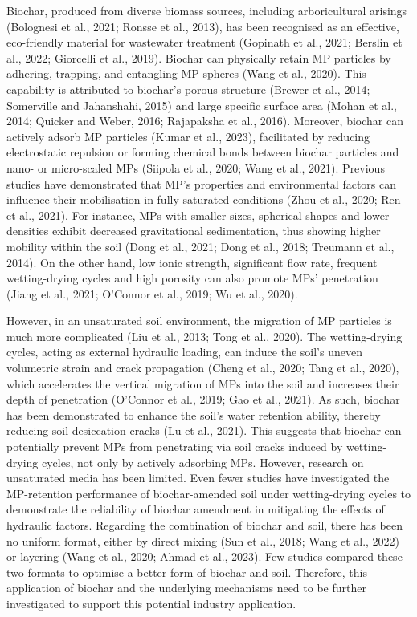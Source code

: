 Biochar, produced from diverse biomass sources, including arboricultural arisings (Bolognesi et al., 2021; Ronsse et al., 2013), has been recognised as an effective, eco-friendly material for wastewater treatment (Gopinath et al., 2021; Berslin et al., 2022; Giorcelli et al., 2019). Biochar can physically retain MP particles by adhering, trapping, and entangling MP spheres (Wang et al., 2020). This capability is attributed to biochar's porous structure (Brewer et al., 2014; Somerville and Jahanshahi, 2015) and large specific surface area (Mohan et al., 2014; Quicker and Weber, 2016; Rajapaksha et al., 2016). Moreover, biochar can actively adsorb MP particles (Kumar et al., 2023), facilitated by reducing electrostatic repulsion or forming chemical bonds between biochar particles and nano- or micro-scaled MPs (Siipola et al., 2020; Wang et al., 2021). Previous studies have demonstrated that MP’s properties and environmental factors can influence their mobilisation in fully saturated conditions (Zhou et al., 2020; Ren et al., 2021). For instance, MPs with smaller sizes, spherical shapes and lower densities exhibit decreased gravitational sedimentation, thus showing higher mobility within the soil (Dong et al., 2021; Dong et al., 2018; Treumann et al., 2014). On the other hand, low ionic strength, significant flow rate, frequent wetting-drying cycles and high porosity can also promote MPs' penetration (Jiang et al., 2021; O’Connor et al., 2019; Wu et al., 2020). \par
However, in an unsaturated soil environment, the migration of MP particles is much more complicated (Liu et al., 2013; Tong et al., 2020). The wetting-drying cycles, acting as external hydraulic loading, can induce the soil’s uneven volumetric strain and crack propagation (Cheng et al., 2020; Tang et al., 2020), which accelerates the vertical migration of MPs into the soil and increases their depth of penetration (O’Connor et al., 2019; Gao et al., 2021). As such, biochar has been demonstrated to enhance the soil's water retention ability, thereby reducing soil desiccation cracks (Lu et al., 2021). This suggests that biochar can potentially prevent MPs from penetrating via soil cracks induced by wetting-drying cycles, not only by actively adsorbing MPs. However, research on unsaturated media has been limited. Even fewer studies have investigated the MP-retention performance of biochar-amended soil under wetting-drying cycles to demonstrate the reliability of biochar amendment in mitigating the effects of hydraulic factors. Regarding the combination of biochar and soil, there has been no uniform format, either by direct mixing (Sun et al., 2018; Wang et al., 2022) or layering (Wang et al., 2020; Ahmad et al., 2023). Few studies compared these two formats to optimise a better form of biochar and soil. Therefore, this application of biochar and the underlying mechanisms need to be further investigated to support this potential industry application.\par
